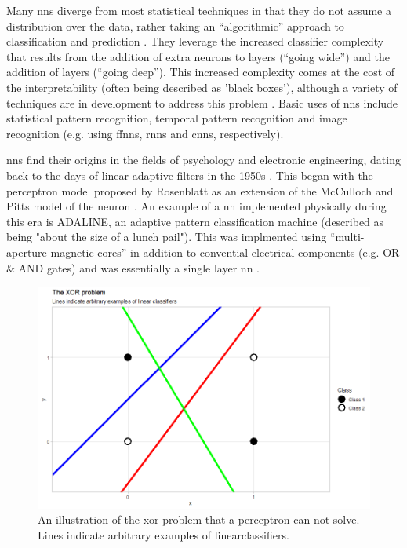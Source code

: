 \bigskip
\bigskip
Many \gls{nn}s diverge from most statistical techniques in that they do not assume a distribution over the data, rather taking an \enquote{algorithmic} approach to classification and prediction \cite{two_cultures}. They leverage the increased classifier complexity that results from the addition of extra neurons to layers (\enquote{going wide}) and the addition of \gls{layer}s (\enquote{going deep}). This increased complexity comes at the cost of the interpretability (often being described as 'black boxes'), although a variety of techniques are in development to address this problem \cite{nn_interpretability}. Basic uses of \gls{nn}s include statistical pattern recognition, temporal pattern recognition and image recognition (e.g. using \gls{ffnn}s, \gls{rnn}s and \gls{cnn}s, respectively).
\bigskip

\gls{nn}s find their origins in the fields of psychology and electronic engineering, dating back to the days of linear adaptive filters in the 1950s \cite{haykin}. This began with the perceptron model proposed by Rosenblatt \cite{perceptron_paper} as an extension of the McCulloch and Pitts model of the neuron \cite{logical_calculus}. An example of a \gls{nn} implemented physically during this era is \gls{ADALINE}, an adaptive pattern classification machine (described as being "about the size of a lunch pail"). This was implmented using \enquote{multi-aperture magnetic cores} in addition to convential electrical components (e.g. OR \& AND gates) and was essentially a single layer \gls{nn} \cite{adaline}.
\bigskip

\begin{figure}
    \centering
    \includegraphics[width=120mm]{figs/xor_problem.png}
    \caption[The \gls{xor} problem]{An illustration of the \gls{xor} problem that a perceptron can not solve. Lines indicate arbitrary examples of \gls{linearclassifier}s.}
    \label{fig:xor_problem}
\end{figure}

